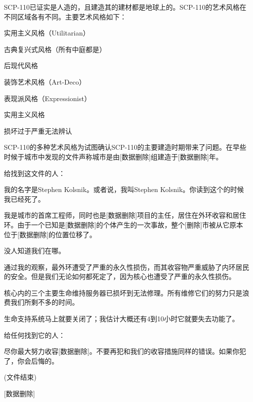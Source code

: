 
SCP-110已证实是人造的，且建造其的建材都是地球上的。SCP-110的艺术风格在不同区域各有不同。主要艺术风格如下：

实用主义风格（Utilitarian）

古典复兴式风格（所有中庭都是）

后现代风格

装饰艺术风格（Art-Deco）

表现派风格（Expressionist）

实用主义风格

损坏过于严重无法辨认

SCP-110的多种艺术风格为试图确认SCP-110的主要建造时期带来了问题。在早些时候于城市中发现的文件声称城市是由{[}数据删除]组建造于{[}数据删除]年。


给找到这文件的人：

我的名字是Stephen Kolsnik。或者说，我叫Stephen Kolsnik。你读到这个的时候我已经死了。

我是城市的首席工程师，同时也是{[}数据删除]项目的主任，居住在外环收容和居住环。由于一个已知是{[}数据删除]的个体产生的一次事故，整个{[}删除]市被从它原本位于{[}数据删除]的位置位移了。

没人知道我们在哪。

通过我的观察，最外环遭受了严重的永久性损伤，而其收容物严重威胁了内环居民的安全。但是我们无论如何都死定了，因为核心也遭受了严重的永久性损伤。

核心内的三个主要生命维持服务器已损坏到无法修理。所有维修它们的努力只是浪费我们所剩不多的时间。

生命支持系统马上就要关闭了；我估计大概还有4到10小时它就要失去功能了。

给任何找到它的人：

尽你最大努力收容{[}数据删除]。不要再犯和我们的收容措施同样的错误。如果你犯了，你会后悔的。

(文件结束)


{[}数据删除]
